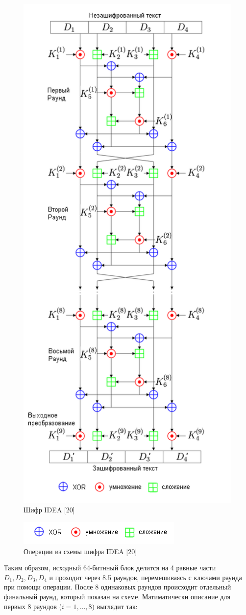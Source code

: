 \documentclass[colorthm]{./civarticle}
\begin{document}
\begin{figure}[H]
    \centering
    \includegraphics[width=0.5\linewidth]{IDEA_encryption.png}
    \caption{Шифр IDEA [20]}
    \label{fig:enter-label}
\end{figure}

\begin{figure}[H]
    \centering
    \includegraphics[width=0.5\linewidth]{Operations.png}
    \caption{Операции из схемы шифра IDEA [20]}
    \label{fig:enter-label}
\end{figure}

Таким образом, исходный 64-битнный блок делится на 4 равные части $D_1, D_2, D_3, D_4$ и проходит через 8.5 раундов, перемешиваясь с ключами раунда при помощи операции. После 8 одинаковых раундов происходит отдельный финальный раунд, который показан на схеме. Матиматически описание для первых 8 раундов ($i=1,\dots,8$) выглядит так:
\end{document}
